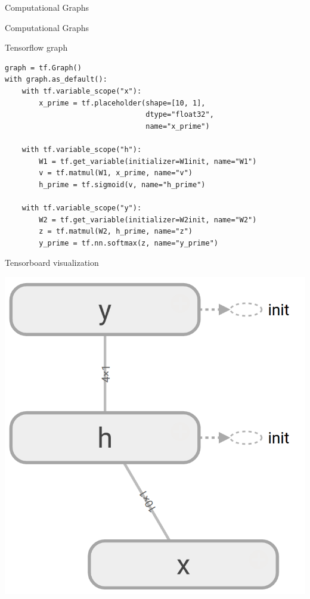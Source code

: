\documentclass[10pt]{beamer}
\begin{document}
\begin{frame}[fragile]{Computational Graphs}

\end{frame}

\begin{frame}[fragile]{Computational Graphs}

\end{frame}



\begin{frame}[fragile]{Tensorflow graph}
\begin{verbatim}
graph = tf.Graph() 
with graph.as_default():
    with tf.variable_scope("x"):
        x_prime = tf.placeholder(shape=[10, 1],
                                 dtype="float32",
                                 name="x_prime") 

    with tf.variable_scope("h"):
        W1 = tf.get_variable(initializer=W1init, name="W1")
        v = tf.matmul(W1, x_prime, name="v")
        h_prime = tf.sigmoid(v, name="h_prime")

    with tf.variable_scope("y"):
        W2 = tf.get_variable(initializer=W2init, name="W2")
        z = tf.matmul(W2, h_prime, name="z")
        y_prime = tf.nn.softmax(z, name="y_prime")
\end{verbatim}
\end{frame}

\begin{frame}[fragile]{Tensorboard visualization}
\begin{center}
\includegraphics[scale=0.27]{images/abstract_tf_graph1.png}
\end{center}
\end{frame}
\end{document}
